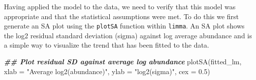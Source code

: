 \documentclass[9pt,a4paper,]{extarticle}
\newenvironment{Shaded}{\begin{snugshade}}{\end{snugshade}}
\newcommand{\AttributeTok}[1]{\textcolor[rgb]{0.77,0.63,0.00}{#1}}
\newcommand{\ConstantTok}[1]{\textcolor[rgb]{0.00,0.00,0.00}{#1}}
\newcommand{\DocumentationTok}[1]{\textcolor[rgb]{0.56,0.35,0.01}{\textbf{\textit{#1}}}}
\newcommand{\FloatTok}[1]{\textcolor[rgb]{0.00,0.00,0.81}{#1}}
\newcommand{\FunctionTok}[1]{\textcolor[rgb]{0.00,0.00,0.00}{#1}}
\newcommand{\NormalTok}[1]{#1}
\newcommand{\OtherTok}[1]{\textcolor[rgb]{0.56,0.35,0.01}{#1}}
\newcommand{\SpecialCharTok}[1]{\textcolor[rgb]{0.00,0.00,0.00}{#1}}
\newcommand{\StringTok}[1]{\textcolor[rgb]{0.31,0.60,0.02}{#1}}
\begin{document}
\begin{Shaded}
\end{Shaded}

Having applied the model to the data, we need to verify that this model was
appropriate and that the statistical assumptions were met. To do this we first
generate an SA plot using the \texttt{plotSA} function within \texttt{limma}. An SA plot shows
the log2 residual standard deviation (sigma) against log average abundance and
is a simple way to visualize the trend that has been fitted to the data.

\begin{Shaded}
\begin{Highlighting}[]
\DocumentationTok{\#\# Plot residual SD against average log abundance}
\FunctionTok{plotSA}\NormalTok{(fitted\_lm,}
       \AttributeTok{xlab =} \StringTok{"Average log2(abundance)"}\NormalTok{,}
       \AttributeTok{ylab =} \StringTok{"log2(sigma)"}\NormalTok{,}
       \AttributeTok{cex =} \FloatTok{0.5}\NormalTok{)}
\end{Highlighting}
\end{Shaded}
\end{document}
